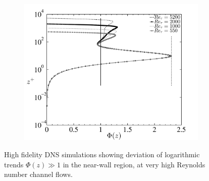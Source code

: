 \begin{figure}
\begin{subfigure}[t]{0.65\textwidth}
\includegraphics[width = \linewidth]{Figure/highRe2bb.pdf}
\end{subfigure}
\caption[Log-law deviation in high $Re_{\tau}$ channel flows]{High fidelity DNS simulations showing deviation of logarithmic trends $\Phi(z) \gg 1$ in the near-wall region, at very high Reynolds number channel flows.}\label{fig:hiRe}
\end{figure} 

